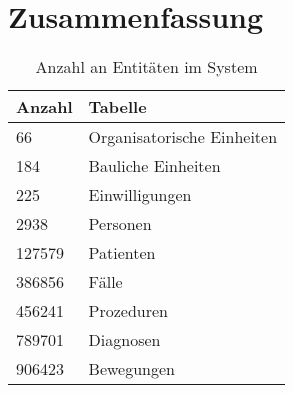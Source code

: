 \section{Zusammenfassung}
\begin{center}
 \begin{longtable}{|p{2.3cm}|p{5cm}|}
  \caption{Anzahl an Entitäten im System} \\
  \hline

\rowcolor{lightgray} Anzahl & Tabelle \\ \hline
\endhead
66 & Organisatorische Einheiten \\ \hline
184 & Bauliche Einheiten \\ \hline
225 & Einwilligungen \\ \hline
2938 & Personen \\ \hline
127579 & Patienten \\ \hline
386856 & Fälle \\ \hline
456241 & Prozeduren \\ \hline
789701 & Diagnosen \\ \hline
906423 & Bewegungen \\ \hline
\end{longtable}
\end{center}
